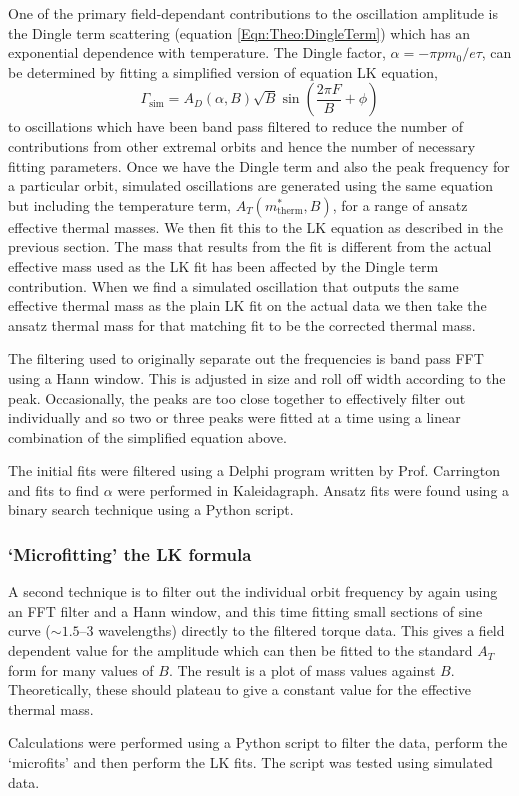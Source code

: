 One of the primary field-dependant contributions to the oscillation amplitude is the Dingle term scattering (equation \ref{Eqn:Theo:DingleTerm}) which has an exponential dependence with temperature. The Dingle factor, $\alpha = -\pi p m_0/e\tau$, can be determined by fitting a simplified version of equation \ac{LK} equation,
\begin{equation}
    \Gamma_{\textrm{sim}} =  A_D(\alpha, B) \sqrt{B} \sin{\left(\frac{2\pi F}{B} + \phi \right)}
\end{equation}
 to oscillations which have been band pass filtered to reduce the number of contributions from other extremal orbits and hence the number of necessary fitting parameters. Once we have the Dingle term and also the peak frequency for a particular orbit, simulated oscillations are generated using the same equation but including the temperature term, $A_T(m^*_{\textrm{therm}}, B)$, for a range of ansatz effective thermal masses. We then fit this to the \ac{LK} equation as described in the previous section. The mass that results from the fit is different from the actual effective mass used as the \ac{LK} fit has been affected by the Dingle term contribution. When we find a simulated oscillation that outputs the same effective thermal mass as the plain \ac{LK} fit on the actual data we then take the ansatz thermal mass for that matching fit to be the corrected thermal mass.

The filtering used to originally separate out the frequencies is band pass \ac{FFT} using a Hann window.  This is adjusted in size and roll off width according to the peak. Occasionally, the peaks are too close together to effectively filter out individually and so two or three peaks were fitted at a time using a linear combination of the simplified equation above.

The initial fits were filtered using a Delphi program written by Prof. Carrington and fits to find $\alpha$ were performed in Kaleidagraph. Ansatz fits were found using a binary search technique using a Python script.


\subsubsection{`Microfitting' the \ac{LK} formula}
\label{Sec:Exp:LKMicrofitting}

A second technique is to filter out the individual orbit frequency by again using an \ac{FFT} filter and a Hann window, and this time fitting small sections of sine curve ($\sim 1.5$--$3$ wavelengths) directly to the filtered torque data. This gives a field dependent value for the amplitude which can then be fitted to the standard $A_T$ form for many values of $B$. The result is a plot of mass values against $B$. Theoretically, these should plateau to give a constant value for the effective thermal mass.

Calculations were performed using a Python script to filter the data, perform the `microfits' and then perform the \ac{LK} fits. The script was tested using simulated data.


